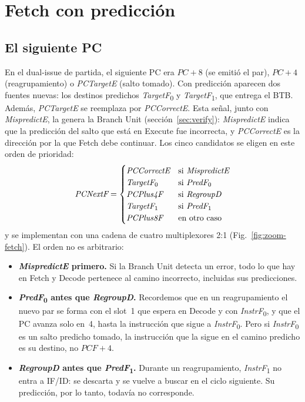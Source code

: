 \documentclass[11pt,a4paper]{article}
\newcommand{\sig}[1]{\textit{#1}}
\newcommand{\sigk}[2]{\textit{#1}\textsubscript{#2}}
\begin{document}
\section{Fetch con predicción}
\label{sec:fetch}

\subsection{El siguiente PC}

En el dual-issue de partida, el siguiente PC era $\sig{PC}+8$ (se emitió el par),
$\sig{PC}+4$ (reagrupamiento) o \sig{PCTargetE} (salto tomado). Con predicción aparecen dos
fuentes nuevas: los destinos predichos \sigk{TargetF}{0} y \sigk{TargetF}{1}, que entrega
el BTB. Además, \sig{PCTargetE} se reemplaza por \sig{PCCorrectE}. Esta señal, junto con
\sig{MispredictE}, la genera la Branch Unit (sección~\ref{sec:verify}): \sig{MispredictE}
indica que la predicción del salto que está en Execute fue incorrecta, y \sig{PCCorrectE}
es la dirección por la que Fetch debe continuar. Los cinco candidatos se eligen en este
orden de prioridad:
\[
  \sig{PCNextF} =
  \begin{cases}
    \sig{PCCorrectE} & \text{si } \sig{MispredictE} \\
    \sigk{TargetF}{0} & \text{si } \sigk{PredF}{0} \\
    \sig{PCPlus4F}   & \text{si } \sig{RegroupD} \\
    \sigk{TargetF}{1} & \text{si } \sigk{PredF}{1} \\
    \sig{PCPlus8F}   & \text{en otro caso}
  \end{cases}
\]
y se implementan con una cadena de cuatro multiplexores 2:1 (Fig.~\ref{fig:zoom-fetch}). El
orden no es arbitrario:
\begin{itemize}
  \item \textbf{\sig{MispredictE} primero.} Si la Branch Unit detecta un error, todo lo que
        hay en Fetch y Decode pertenece al camino incorrecto, incluidas sus predicciones.
  \item \textbf{\sigk{PredF}{0} antes que \sig{RegroupD}.} Recordemos que en un
        reagrupamiento el nuevo par se forma con el slot~1 que espera en Decode y con
        \sigk{InstrF}{0}, y que el PC avanza solo en~4, hasta la instrucción que sigue a
        \sigk{InstrF}{0}. Pero si \sigk{InstrF}{0} es un salto predicho tomado, la
        instrucción que la sigue en el camino predicho es su destino, no
        $\sig{PCF}+4$.
  \item \textbf{\sig{RegroupD} antes que \sigk{PredF}{1}.} Durante un reagrupamiento,
        \sigk{InstrF}{1} no entra a IF/ID: se descarta y se vuelve a buscar en el ciclo
        siguiente. Su predicción, por lo tanto, todavía no corresponde.
\end{itemize}
\end{document}
